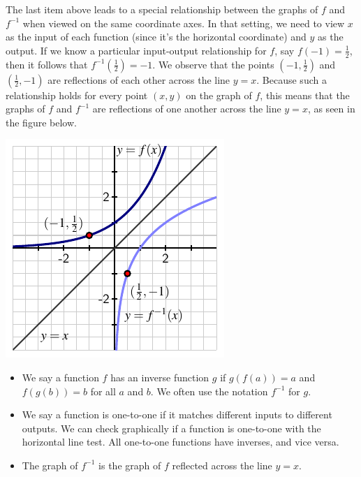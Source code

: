 \documentclass[nooutcomes]{ximera}
\begin{document}
The last item above leads to a special relationship between the graphs of $f$ and $f^{-1}$ when viewed on the same coordinate axes.  In that setting, we need to view $x$ as the input of each function (since it's the horizontal coordinate) and $y$ as the output.  If we know a particular input-output relationship for $f$, say $f(-1) = \frac{1}{2}$, then it follows that $f^{-1} \left( \frac{1}{2} \right) = -1$.  We observe that the points $\left(-1, \frac{1}{2} \right)$ and $\left(\frac{1}{2}, -1 \right)$ are reflections of each other across the line $y = x$.  Because such a relationship holds for every point $(x,y)$ on the graph of $f$, this means that the graphs of $f$ and $f^{-1}$ are reflections of one another across the line $y = x$, as seen in the figure below.

\begin{image}
\includegraphics{inverse-plot-reflection.pdf}
\end{image}

\begin{summary}\begin{itemize}
\item We say a function $f$ has an inverse function $g$ if $g(f(a)) = a$ and $f(g(b)) = b$ for all $a$ and $b$. We often use the notation $f^{-1}$ for $g$.
\item We say a function is one-to-one if it matches different inputs to different outputs. We can check graphically if a function is one-to-one with the horizontal line test. All one-to-one functions have inverses, and vice versa. 
\item The graph of $f^{-1}$ is the graph of $f$ reflected across the line $y = x$.
\end{itemize}\end{summary}
\end{document}
